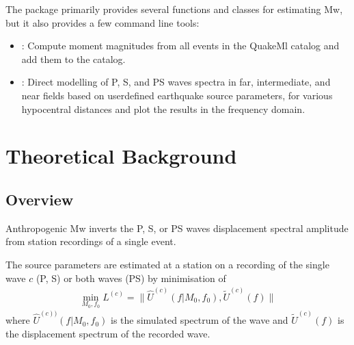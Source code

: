 \documentclass[letterpaper,10pt,english]{sphinxmanual}
\begin{document}
\sphinxAtStartPar
The  package primarily provides several functions and classes for estimating Mw,
but it also provides a few command line tools:
\begin{itemize}
\item {} 
\sphinxAtStartPar
{}: Compute moment magnitudes from all events in the QuakeMl catalog
and add them to the catalog.

\item {} 
\sphinxAtStartPar
{}: Direct modelling of P, S, and PS waves spectra in far, intermediate,
and near fields based on user\sphinxhyphen{}defined earthquake source parameters,
for various hypocentral distances and
plot the results in the frequency domain.

\end{itemize}

\sphinxstepscope


\chapter{Theoretical Background}
\label{\detokenize{description:theoretical-background}}\label{\detokenize{description:description}}\label{\detokenize{description::doc}}

\section{Overview}
\label{\detokenize{description:overview}}
\sphinxAtStartPar
Anthropogenic Mw inverts the P, S, or PS waves displacement spectral amplitude from
station recordings of a single event.

\sphinxAtStartPar
The source parameters are estimated at a station on a recording of the single wave \(c\) (P, S)
or both waves (PS) by minimisation of
\begin{equation*}
\begin{split}\underset{M_0,f_0} {\min} L^{\left(c\right)}= \|\widehat{U}^{(c)}\left( f|M_0,f_0\right),
\widetilde{U}^{\left(c\right)}\left( f \right)\|\end{split}
\end{equation*}
\sphinxAtStartPar
where \(\widehat{U}^{(c))}\left( f|M_0,f_0\right)\) is the simulated spectrum of the wave
and \(\widetilde{U}^{(c)}\left(f\right)\) is the displacement spectrum of the recorded wave.
\end{document}
